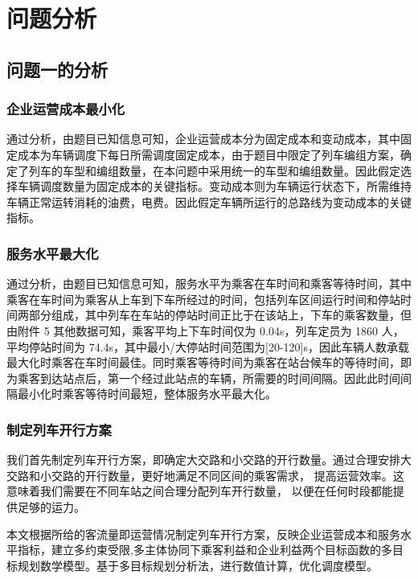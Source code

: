 \documentclass[UTF8]{ctexart}
\begin{document}
\section{问题分析}
\subsection{问题一的分析}
\subsubsection{企业运营成本最小化}
通过分析，由题目已知信息可知，企业运营成本分为固定成本和变动成本，其中固定成本为车辆调度下每日所需调度固定成本，由于题目中限定了列车编组方案，确定了列车的车型和编组数量，在本问题中采用统一的车型和编组数量。因此假定选择车辆调度数量为固定成本的关键指标。变动成本则为车辆运行状态下，所需维持车辆正常运转消耗的油费，电费。因此假定车辆所运行的总路线为变动成本的关键指标。\par
\subsubsection{服务水平最大化}
通过分析，由题目已知信息可知，服务水平为乘客在车时间和乘客等待时间，其中乘客在车时间为乘客从上车到下车所经过的时间，包括列车区间运行时间和停站时间两部分组成，其中列车在车站的停站时间正比于在该站上，下车的乘客数量，但由附件 5 其他数据可知，乘客平均上下车时间仅为 0.04s，列车定员为 1860 人，平均停站时间为 74.4s，其中最小/大停站时间范围为[20-120]s，因此车辆人数承载最大化时乘客在车时间最佳。同时乘客等待时间为乘客在站台候车的等待时间，即为乘客到达站点后，第一个经过此站点的车辆，所需要的时间间隔。因此此时间间隔最小化时乘客等待时间最短，整体服务水平最大化。\par
\subsubsection{制定列车开行方案}
我们首先制定列车开行方案，即确定大交路和小交路的开行数量。通过合理安排大交路和小交路的开行数量，更好地满足不同区间的乘客需求， 提高运营效率。这意味着我们需要在不同车站之间合理分配列车开行数量， 以便在任何时段都能提供足够的运力。\par
本文根据所给的客流量即运营情况制定列车开行方案，反映企业运营成本和服务水平指标，建立多约束受限,多主体协同下乘客利益和企业利益两个目标函数的多目标规划数学模型。基于多目标规划分析法，进行数值计算，优化调度模型。\par
\end{document}
